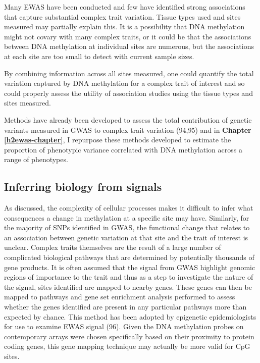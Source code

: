 \documentclass[11pt,oneside]{bristolthesis}
\begin{document}
Many EWAS have been conducted and few have identified strong associations that capture substantial complex trait variation. Tissue types used and sites measured may partially explain this. It is a possibility that DNA methylation might not covary with many complex traits, or it could be that the associations between DNA methylation at individual sites are numerous, but the associations at each site are too small to detect with current sample sizes.

By combining information across all sites measured, one could quantify the total variation captured by DNA methylation for a complex trait of interest and so could properly assess the utility of association studies using the tissue types and sites measured.

Methods have already been developed to assess the total contribution of genetic variants measured in GWAS to complex trait variation (94,95) and in \textbf{Chapter \ref{h2ewas-chapter}}, I repurpose these methods developed to estimate the proportion of phenotypic variance correlated with DNA methylation across a range of phenotypes.

\hypertarget{inferring-biology-from-signals}{%
\subsection{Inferring biology from signals}\label{inferring-biology-from-signals}}

As discussed, the complexity of cellular processes makes it difficult to infer what consequences a change in methylation at a specific site may have. Similarly, for the majority of SNPs identified in GWAS, the functional change that relates to an association between genetic variation at that site and the trait of interest is unclear. Complex traits themselves are the result of a large number of complicated biological pathways that are determined by potentially thousands of gene products. It is often assumed that the signal from GWAS highlight genomic regions of importance to the trait and thus as a step to investigate the nature of the signal, sites identified are mapped to nearby genes. These genes can then be mapped to pathways and gene set enrichment analysis performed to assess whether the genes identified are present in any particular pathways more than expected by chance. This method has been adopted by epigenetic epidemiologists for use to examine EWAS signal (96). Given the DNA methylation probes on contemporary arrays were chosen specifically based on their proximity to protein coding genes, this gene mapping technique may actually be more valid for CpG sites.
\end{document}
